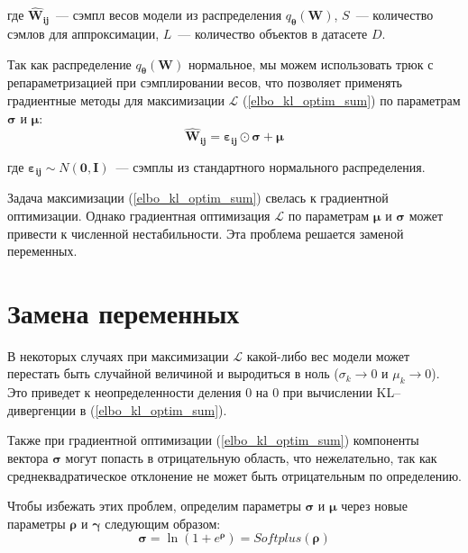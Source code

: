 \documentclass{article}
\numberwithin{equation}{section}
\begin{document}
    где $\pmb{\hat{W}_{ij}}$~--- сэмпл весов модели из распределения
    $q_{\pmb{\theta}}(\pmb{W})$,
    $S$~--- количество сэмлов для аппроксимации,
    $L$~--- количество объектов в датасете $D$.

    Так как распределение $q_{\pmb{\theta}}(\pmb{W})$ нормальное,
    мы можем использовать трюк с репараметризацией при сэмплировании весов,
    что позволяет применять градиентные методы для
    максимизации $\mathcal{L}$ (\ref{elbo_kl_optim_sum})
    по параметрам $\pmb{\sigma}$ и $\pmb{\mu}$:
    \begin{equation}\label{w_trick}
        \pmb{\hat{W}_{ij}}
        =
            \pmb{\varepsilon_{ij}}
            \odot
            \pmb{\sigma}
            +
            \pmb{\mu}
    \end{equation}

    где $\pmb{\varepsilon_{ij}} \sim N(\pmb{0}, \pmb{I})$~--- сэмплы из стандартного
    нормального распределения.

    Задача максимизации (\ref{elbo_kl_optim_sum})
    свелась к градиентной оптимизации.
    Однако градиентная оптимизация $\mathcal{L}$ по параметрам $\pmb{\mu}$ и $\pmb{\sigma}$ может привести
    к численной нестабильности. Эта проблема решается заменой переменных.

    \section{Замена переменных}

    В некоторых случаях при максимизации $\mathcal{L}$
    какой-либо вес модели может перестать быть случайной величиной
    и выродиться в ноль
    ($\sigma_{k} \rightarrow 0$ и $\mu_{k} \rightarrow 0$).
    Это приведет к неопределенности деления 0 на 0
    при вычислении KL--дивергенции в (\ref{elbo_kl_optim_sum}).

    Также при градиентной оптимизации (\ref{elbo_kl_optim_sum})
    компоненты вектора $\pmb{\sigma}$ могут попасть в отрицательную область,
    что нежелательно, так как среднеквадратическое отклонение
    не может быть отрицательным по определению.

    Чтобы избежать этих проблем,
    определим параметры $\pmb{\sigma}$ и $\pmb{\mu}$
    через новые параметры $\pmb{\rho}$ и $\pmb{\gamma}$
    следующим образом:
    \begin{equation}\label{sigma_def}
        \pmb{\sigma}
        =
            \ln({
                1 + e^{\pmb{\rho}}
            })
        =
            Softplus (\pmb{\rho})
    \end{equation}
\end{document}

